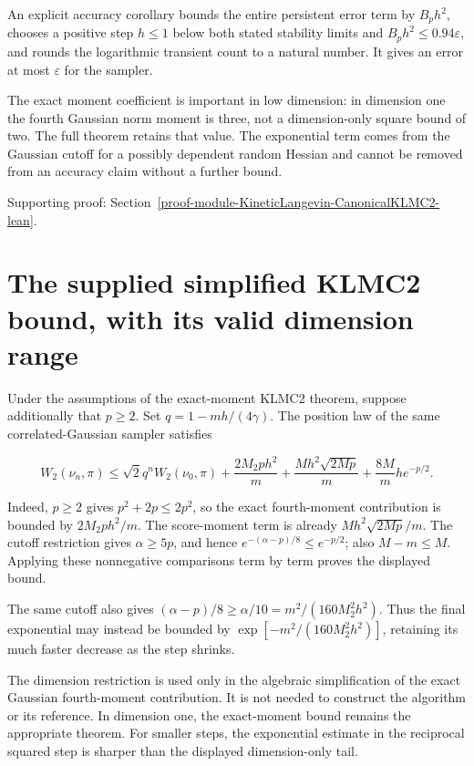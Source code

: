 \documentclass[11pt,a4paper]{report}
\begin{document}
An explicit accuracy corollary bounds the entire persistent error term by \(B_ph^2\), chooses a positive step \(h\le1\) below both stated stability limits and \(B_ph^2\le0.94\varepsilon\), and rounds the logarithmic transient count to a natural number. It gives an error at most \(\varepsilon\) for the sampler.



The exact moment coefficient is important in low dimension: in dimension one the fourth Gaussian norm moment is three, not a dimension-only square bound of two. The full theorem retains that value. The exponential term comes from the Gaussian cutoff for a possibly dependent random Hessian and cannot be removed from an accuracy claim without a further bound.


{\small\color{gray}Supporting proof: Section~\ref{proof-module-KineticLangevin-CanonicalKLMC2-lean}.\par}
\section{\texorpdfstring{The supplied simplified KLMC2 bound, with its valid dimension range}{The supplied simplified KLMC2 bound, with its valid dimension range}}


Under the assumptions of the exact-moment KLMC2 theorem, suppose additionally that \(p\ge2\). Set \(q=1-mh/(4\gamma)\). The position law of the same correlated-Gaussian sampler satisfies


\[W_2(\nu_n,\pi)\le\sqrt2q^nW_2(\nu_0,\pi)+\frac{2M_2ph^2}{m}+\frac{Mh^2\sqrt{2Mp}}m+\frac{8M}{m}he^{-p/2}.\]


Indeed, \(p\ge2\) gives \(p^2+2p\le2p^2\), so the exact fourth-moment contribution is bounded by \(2M_2ph^2/m\). The score-moment term is already \(Mh^2\sqrt{2Mp}/m\). The cutoff restriction gives \(\alpha\ge5p\), and hence \(e^{-(\alpha-p)/8}\le e^{-p/2}\); also \(M-m\le M\). Applying these nonnegative comparisons term by term proves the displayed bound.




The same cutoff also gives \((\alpha-p)/8\ge\alpha/10=m^2/(160M_2^2h^2)\). Thus the final exponential may instead be bounded by \(\exp[-m^2/(160M_2^2h^2)]\), retaining its much faster decrease as the step shrinks.



The dimension restriction is used only in the algebraic simplification of the exact Gaussian fourth-moment contribution. It is not needed to construct the algorithm or its reference. In dimension one, the exact-moment bound remains the appropriate theorem. For smaller steps, the exponential estimate in the reciprocal squared step is sharper than the displayed dimension-only tail.
\end{document}
